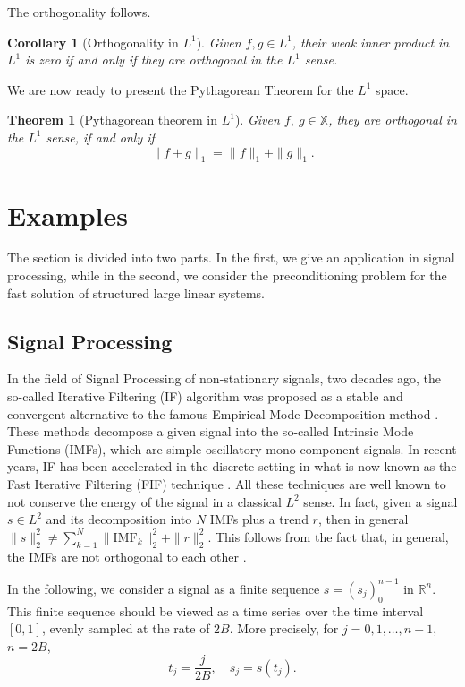 \documentclass{article}
\newtheorem{theorem}{Theorem}
\newtheorem{corollary}{Corollary}
\begin{document}
The orthogonality follows.
\begin{corollary}[Orthogonality in $L^1$]\label{cor:orth_L1}
Given $f,g\in L^1$, their weak inner product in $L^1$ is zero if and only if they are orthogonal in the $L^1$ sense.
\end{corollary}

We are now ready to present the Pythagorean Theorem for the $L^1$ space.
\begin{theorem}[Pythagorean theorem in $L^1$]\label{thm:pytha_L1} %
Given $f,\ g\in \mathbb{X}$, they are orthogonal in the $L^1$ sense, if and only if
\begin{equation}\label{eq:pytha_L1}
	\|f+g\|_1=\|f\|_1+\|g\|_1.
\end{equation}
\end{theorem}

\section{Examples}

The section is divided into two parts. In the first, we give an application in signal processing, while in the second, we consider the preconditioning problem for the fast solution of structured large linear systems.

\subsection{Signal Processing}

In the field of Signal Processing of non-stationary signals, two decades ago, the so-called Iterative Filtering (IF) algorithm was proposed \cite{lin2009iterative} as a stable and convergent alternative to the famous Empirical Mode Decomposition method \cite{huang1998empirical}. These methods decompose a given signal into the so-called Intrinsic Mode Functions (IMFs), which are simple oscillatory mono-component signals. In recent years, IF has been accelerated in the discrete setting in what is now known as the Fast Iterative Filtering (FIF) technique \cite{cicone2021numerical}. All these techniques are well known to not conserve the energy of the signal in a classical $L^2$ sense. In fact, given a signal $s\in L^2$ and its decomposition into $N$ IMFs plus a trend $r$, then in general $\|s\|_2^2 \neq \sum_{k=1}^N \|\textrm{IMF}_k\|_2^2+\|r\|_2^2$. This follows from the fact that, in general, the IMFs are not orthogonal to each other \cite{cicone2022multivariate}.

In the following, we consider a signal as a finite sequence $s=(s_j)_{0}^{n-1}$ in $\mathbb{R}^n$. This finite sequence should be viewed as a time series over the time interval $[0, 1]$, evenly sampled at the rate of $2B$. More precisely, for $j=0, 1, \dots,  n-1$, $n=2B$,
\begin{equation}
    t_j =\frac{j}{2B},\quad s_j = s(t_j).\label{eq:t_j}
\end{equation}
\end{document}
